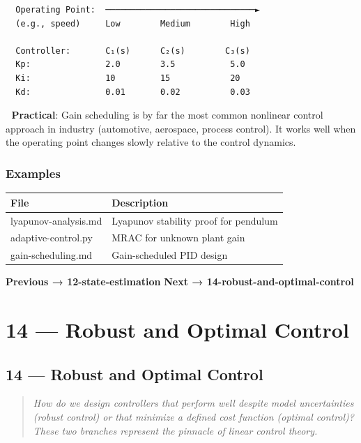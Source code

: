 \documentclass[11pt,a4paper]{book}
\begin{document}
\begin{itemize}
\begin{lstlisting}
  Operating Point:  ──────────────────────────────►
  (e.g., speed)     Low        Medium        High
  
  Controller:       C₁(s)      C₂(s)        C₃(s)
  Kp:               2.0        3.5           5.0
  Ki:               10         15            20
  Kd:               0.01       0.02          0.03
\end{lstlisting}

🔧 \textbf{Practical}: Gain scheduling is by far the most common nonlinear control approach in industry (automotive, aerospace, process control). It works well when the operating point changes slowly relative to the control dynamics.

\medskip\noindent\hrulefill\medskip

\subsection{Examples}

\begin{center}
\begin{tabular}{|l|l|}
\hline
File & Description \\
\hline
lyapunov-analysis.md & Lyapunov stability proof for pendulum \\
adaptive-control.py & MRAC for unknown plant gain \\
gain-scheduling.md & Gain-scheduled PID design \\
\hline
\end{tabular}
\end{center}

\medskip\noindent\hrulefill\medskip

\textbf{Previous → 12-state-estimation}  
\textbf{Next → 14-robust-and-optimal-control}


\chapter{14 — Robust and Optimal Control}
\section{14 — Robust and Optimal Control}

\begin{quote}
\textit{How do we design controllers that perform well despite model uncertainties (robust control) or that minimize a defined cost function (optimal control)? These two branches represent the pinnacle of linear control theory.}
\end{quote}


\end{itemize}
\end{document}
